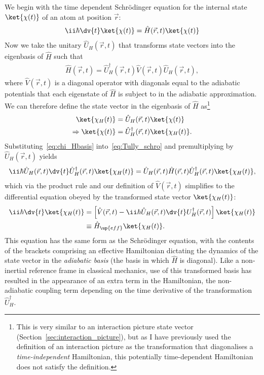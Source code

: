 We begin with the time dependent Schr\"odinger equation for the internal state $\ket{\chi(t)}$ of an atom at position $\vec r$:
\begin{align}
\ii\hbar\dv{t}\ket{\chi(t)} = \hat H(\vec r, t)\ket{\chi(t)}\label{eq:Tully_schro}
\end{align}
Now we take the unitary $\hat U_H(\vec r, t)$ that transforms state vectors into the eigenbasis of $\hat H$ such that
\begin{align}
\hat H(\vec r, t) = \hat U_H^\dagger(\vec r, t) \hat V(\vec r, t) \hat U_H(\vec r, t),
\end{align}
where $\hat V(\vec r, t)$ is a diagonal operator with diagonals equal to the adiabatic potentials that each eigenstate of $\hat H$ is subject to in the adiabatic approximation.
We can therefore define the state vector in the eigenbasis of $\hat H$ as\footnote{This is very similar to an interaction picture state vector (Section~\ref{sec:interaction_picture}), but as I have previously used the definition of an interaction picture as the transformation that diagonalises a \emph{time-independent} Hamiltonian, this potentially time-dependent Hamiltonian does not satisfy the definition.}
\begin{align}\label{eq:chi_Hbasis}
\ket{\chi_H(t)} &= \hat U_H(\vec r, t)\ket{\chi(t)}\\
\Rightarrow \ket{\chi(t)} &= \hat U^\dagger_H(\vec r, t)\ket{\chi_H(t)}.
\end{align}
Substituting~\eqref{eq:chi_Hbasis} into~\eqref{eq:Tully_schro} and premultiplying by $\hat U_H(\vec r, t)$ yields
\begin{align}
\ii\hbar\hat U_H(\vec r, t)\dv{t}\hat U^\dagger_H(\vec r, t)\ket{\chi_H(t)} = \hat U_H(\vec r, t)\hat H(\vec r, t)\hat U^\dagger_H(\vec r, t)\ket{\chi_H(t)},
\end{align}
which via the product rule and our definition of $\hat V(\vec r, t)$ simplifies to the differential equation obeyed by the transformed state vector $\ket{\chi_H(t)}$:
\begin{align}\label{eq:Tully_adiabatic_schro}
\ii\hbar\dv{t}\ket{\chi_H(t)} &= \left[
  \hat V(\vec r, t)
  - \ii\hbar\hat U_H(\vec r, t)\dv{t}U^\dagger_H(\vec r, t)
 \right]\ket{\chi_H(t)}\\
 &\equiv \hat H_\up{eff} \ket{\chi_H(t)}.\label{eq:Tully_adiabatic_eff}
\end{align}
This equation has the same form as the Schr\"odinger equation, with the contents of the brackets comprising an effective Hamiltonian dictating the dynamics of the state vector in the \emph{adiabatic basis} (the basis in which $\hat H$ is diagonal). Like a non-inertial reference frame in classical mechanics, use of this transformed basis has resulted in the appearance of an extra term in the Hamiltonian, the non-adiabatic coupling term depending on the time derivative of the transformation $\hat U_H^\dagger$.

